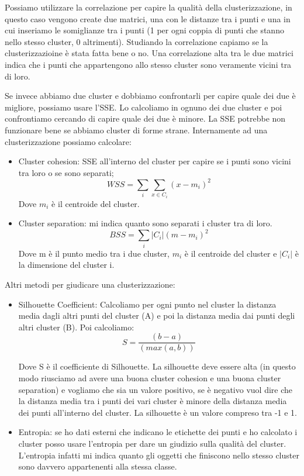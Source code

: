 \documentclass[14pt]{extreport}
\begin{document}
Possiamo utilizzare la correlazione per capire la qualità della clusterizzazione, in questo caso vengono create due matrici, una con le distanze tra i punti e una in cui inseriamo le somiglianze tra i punti (1 per ogni coppia di punti che stanno nello stesso cluster, 0 altrimenti). Studiando la correlazione capiamo se la clusterizzazioine è stata fatta bene o no.
Una correlazione alta tra le due matrici indica che i punti che appartengono allo stesso cluster sono veramente vicini tra di loro.

Se invece abbiamo due cluster e dobbiamo confrontarli per capire quale dei due è migliore, possiamo usare l'SSE. Lo calcoliamo in ognuno dei due cluster e poi confrontiamo cercando di capire quale dei due è minore.
La SSE potrebbe non funzionare bene se abbiamo cluster di forme strane.
Internamente ad una clusterizzazione possiamo calcolare:
\begin{itemize}
\item Cluster cohesion: SSE all'interno del cluster per capire se i punti sono vicini tra loro o se sono separati;
\begin{equation}
WSS = \sum_i \sum\limits_{x \in C_i} (x-m_i)^2
\end{equation}
Dove $m_i$ è il centroide del cluster.
\item Cluster separation: mi indica quanto sono separati i cluster tra di loro.
\begin{equation}
BSS = \sum_i |C_i| (m-m_i)^2
\end{equation}
Dove m è il punto medio tra i due cluster, $m_i$ è il centroide del cluster e $|C_i|$ è la dimensione del cluster i.
\end{itemize}

Altri metodi per giudicare una clusterizzazione:

\begin{itemize}
    
    \item Silhouette Coefficient: Calcoliamo per ogni punto nel cluster la distanza media dagli altri punti del cluster (A) e poi la distanza media dai punti degli altri cluster (B). Poi calcoliamo:
    \newline
     \begin{equation}
            S = \frac{(b-a)}{(max(a,b))}
    \end{equation}
    
    Dove S è il coefficiente di Silhouette. La silhouette deve essere alta (in questo modo riusciamo ad avere una buona cluster cohesion e una buona cluster separation) e vogliamo che sia un valore positivo, se è negativo vuol dire che la distanza media tra i punti dei vari cluster è minore della distanza media dei punti all'interno del cluster.
    La silhouette è un valore compreso tra -1 e 1.
    \item Entropia: se ho dati esterni che indicano le etichette dei punti e ho calcolato i cluster posso usare l'entropia per dare un giudizio sulla qualità del cluster. L'entropia infatti mi indica quanto gli oggetti che finiscono nello stesso cluster sono davvero appartenenti alla stessa classe.
\end{itemize}
\end{document}
